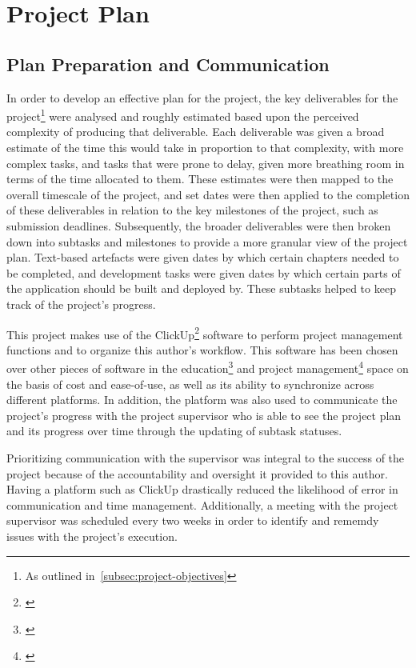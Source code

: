 
\thispagestyle{plain}
\newpage
\section{Project Plan}\label{sec:project-plan}

\normalsize

\subsection{Plan Preparation and Communication}\label{subsec:plan-preparation-and-communication}

In order to develop an effective plan for the project, the key deliverables for the project\footnote{As outlined in~\ref{subsec:project-objectives}} were analysed and roughly estimated based upon the perceived complexity of producing that deliverable.
Each deliverable was given a broad estimate of the time this would take in proportion to that complexity, with more complex tasks, and tasks that were prone to delay, given more breathing room in terms of the time allocated to them.
These estimates were then mapped to the overall timescale of the project, and set dates were then applied to the completion of these deliverables in relation to the key milestones of the project, such as submission deadlines.
Subsequently, the broader deliverables were then broken down into subtasks and milestones to provide a more granular view of the project plan.
Text-based artefacts were given dates by which certain chapters needed to be completed, and development tasks were given dates by which certain parts of the application should be built and deployed by.
These subtasks helped to keep track of the project's progress.

This project makes use of the ClickUp\footnote{\citep{clickup}} software to perform project management functions and to organize this author’s workflow.
This software has been chosen over other pieces of software in the education\footnote{\citep{education_software}} and project management\footnote{\citep{pm_software}} space on the basis of cost and ease-of-use, as well as its ability to synchronize across different platforms.
In addition, the platform was also used to communicate the project's progress with the project supervisor who is able to see the project plan and its progress over time through the updating of subtask statuses.

Prioritizing communication with the supervisor was integral to the success of the project because of the accountability and oversight it provided to this author.
Having a platform such as ClickUp drastically reduced the likelihood of error in communication and time management.
Additionally, a meeting with the project supervisor was scheduled every two weeks in order to identify and rememdy issues with the project's execution.

